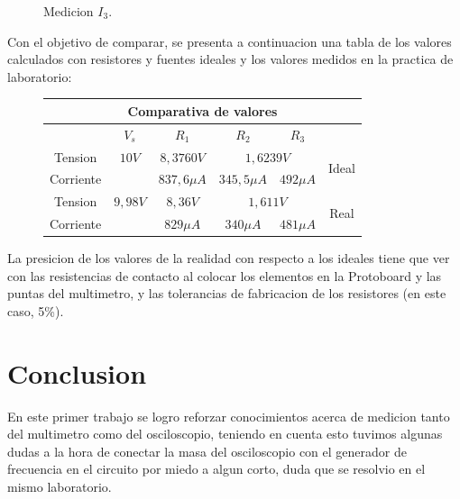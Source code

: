 \documentclass[a4paper,12pt, spanish]{report}
\begin{document}
\begin{figure}[H]
\begin{minipage}{0.3\textwidth}
            \caption{Medicion $I_3$.}
          \end{minipage}
      \end{figure}


      Con el objetivo de comparar, se presenta a continuacion una tabla de los valores calculados con resistores y
      fuentes ideales y los valores medidos en la practica de laboratorio:
      \begin{figure}[!h]
        \centering
        \begin{tabular}[c]{|c||c|c|c|c||c|}
          \hline
          \multicolumn{6}{|c|}{Comparativa de valores}\\
          \hline
                    & $V_s$         & $R_1$         & $R_2$         & $R_3$         & \\
          \hline
          Tension   & $10V$         & $8,3760V$     & \multicolumn{2}{|c||}{$1,6239V$} & \multirow{2}{*}{Ideal}\\
          \cline{1-5}
          Corriente &               & $837,6\mu A$  & $345,5\mu A$  & $492\mu A$    & \\
          \hline
          Tension   & $9,98V$       & $8,36V$       & \multicolumn{2}{|c||}{$1,611V$}  & \multirow{2}{*}{Real}\\
          \cline{1-5}
          Corriente &               & $829\mu A$    & $340\mu A$    & $481\mu A$    & \\
          \hline
        \end{tabular}
      \end{figure}
      
      La presicion de los valores de la realidad con respecto a los ideales tiene que ver con las resistencias de
      contacto al colocar los elementos en la Protoboard y las puntas del multimetro, y las tolerancias de fabricacion
      de los resistores (en este caso, 5\%).
      \newpage
      \chapter{Conclusion}
      En este primer trabajo se logro reforzar conocimientos acerca de medicion tanto del multimetro como del osciloscopio, teniendo en cuenta esto tuvimos algunas dudas a la hora de conectar la masa del osciloscopio con el generador de frecuencia en el circuito por miedo a algun corto, duda que se resolvio en el mismo laboratorio.
\end{document}
